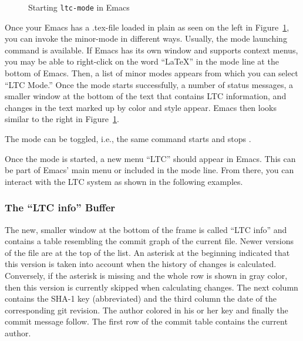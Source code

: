 \begin{figure}[t]
\centering
{}
\hspace{2ex}
\hspace{2ex}
\caption{Starting \texttt{ltc-mode} in Emacs} \label{fig:emacs-ltc-started}
\end{figure}

Once your Emacs has a .tex-file loaded in plain  as seen on the left in Figure~\ref{fig:emacs-ltc-started}, you can invoke the minor-mode  in different ways.  Usually, the mode launching command  is available.  If Emacs has its own window and supports context menus, you may be able to right-click on the word ``LaTeX'' in the mode line at the bottom of Emacs. Then, a list of minor modes appears from which you can select ``LTC Mode.''  Once the mode starts successfully, a number of status messages, a smaller window at the bottom of the text that contains LTC information, and changes in the text marked up by color and style appear.  Emacs then looks similar to the right in Figure~\ref{fig:emacs-ltc-started}.

The mode can be toggled, i.e., the same command starts and stops .

Once the mode is started, a new menu ``LTC'' should appear in Emacs.  This can be part of Emacs' main menu or included in the mode line.  From there, you can interact with the LTC system as shown in the following examples.

\subsubsection{The ``LTC info'' Buffer}

The new, smaller window at the bottom of the frame is called ``LTC info'' and contains a table resembling the commit graph of the current file.  Newer versions of the file are at the top of the list.  An asterisk at the beginning  indicated that this version is taken into account when the history of changes is calculated.  Conversely, if the asterisk is missing and the whole row is shown in gray color, then this version is currently skipped when calculating changes.  The next column contains the SHA-1 key (abbreviated) and the third column the date  of the corresponding git revision.  The author colored in his or her key and finally the commit message follow.  The first row of the commit table contains the current author.


